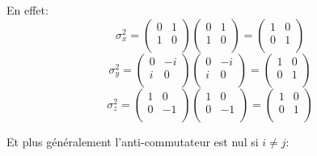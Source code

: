 \documentclass[12pt,a4paper]{article}
\begin{document}
	En effet:
	\[
	\sigma_x^2=\begin{pmatrix}
	0&1\\
	1&0\\
	\end{pmatrix}
	\begin{pmatrix}
	0&1\\
	1&0\\
	\end{pmatrix}
	=
	\begin{pmatrix}
	1&0\\
	0&1\\
	\end{pmatrix}
	\]
	\[
	\sigma_y^2=\begin{pmatrix}
	0&-i\\
	i&0\\
	\end{pmatrix}
	\begin{pmatrix}
	0&-i\\
	i&0\\
	\end{pmatrix}
	=
	\begin{pmatrix}
	1&0\\
	0&1\\
	\end{pmatrix}
	\]
	\[
	\sigma_z^2=\begin{pmatrix}
	1&0\\
	0&-1\\
	\end{pmatrix}
	\begin{pmatrix}
	1&0\\
	0&-1\\
	\end{pmatrix}
	=
	\begin{pmatrix}
	1&0\\
	0&1\\
	\end{pmatrix}
	\]
	
	Et plus généralement l'anti-commutateur est nul si $i\ne j$:
	
\end{document}
